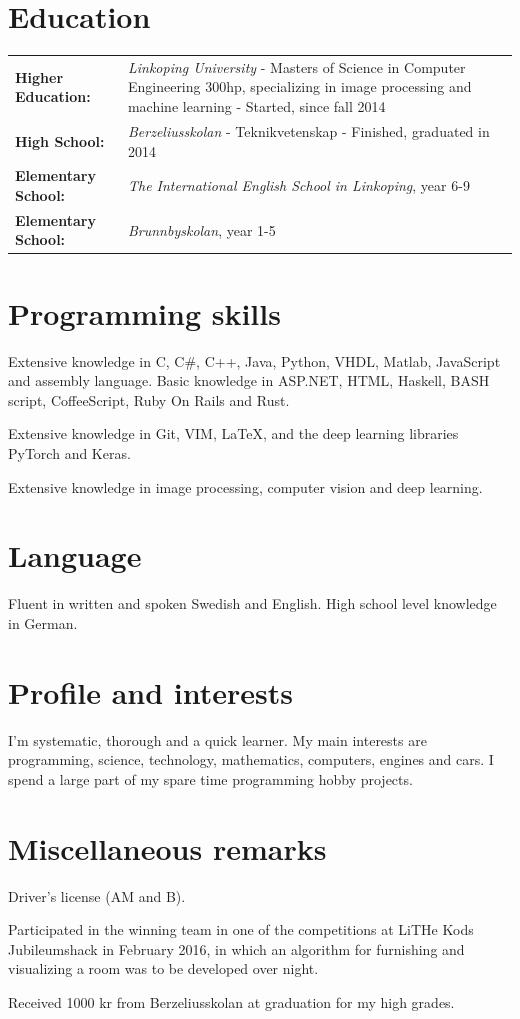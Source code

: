 \documentclass[a4paper,notitlepage]{article}
\begin{document}
\section*{Education}
\noindent\begin{tabular}{@{}l p{11cm}}
	\textbf{Higher Education:} & \textit{Linkoping University} - Masters of
    Science in Computer Engineering 300hp, specializing in image processing and
    machine learning - Started, since fall 2014 \\

	\textbf{High School:} & \textit{Berzeliusskolan} - Teknikvetenskap -
	Finished, graduated in 2014 \\

	\textbf{Elementary School:} & \textit{The International English School in Linkoping},
	year 6-9 \\

	\textbf{Elementary School:} & \textit{Brunnbyskolan}, year 1-5 \\
	\end{tabular}

\section*{Programming skills}
Extensive knowledge in C, C\#, C++, Java, Python, VHDL, Matlab, JavaScript
and assembly language. Basic knowledge in ASP.NET, HTML, Haskell, BASH script,
CoffeeScript, Ruby On Rails and Rust.

Extensive knowledge in Git, VIM, LaTeX, and the deep learning libraries PyTorch
and Keras.

Extensive knowledge in image processing, computer vision and deep learning.

\section*{Language}
Fluent in written and spoken Swedish and English. High school level knowledge
in German.

\section*{Profile and interests}
I'm systematic, thorough and a quick learner. My main interests are
programming, science, technology, mathematics, computers, engines and cars. I
spend a large part of my spare time programming hobby projects.

\section*{Miscellaneous remarks}

Driver's license (AM and B).

Participated in the winning team in one of the competitions at LiTHe Kods
Jubileumshack in February 2016, in which an algorithm for furnishing and
visualizing a room was to be developed over night.

Received 1000 kr from Berzeliusskolan at graduation for my high grades.
\end{document}
